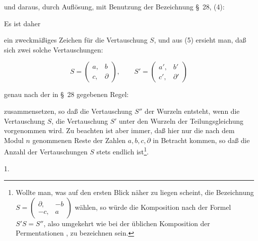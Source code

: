und daraus, durch Auflösung, mit Benutzung der Bezeichnung \S\, 28, (4):


Es ist daher


ein zweckmäßiges Zeichen für die Vertauschung $S$, und aus (5) ersieht man, daß sich zwei solche Vertauschungen:

\[
S = \begin{pmatrix} a, & b \\ c, & \partial \end{pmatrix}, \qquad S' = \begin{pmatrix} a', & b' \\ c', & \partial' \end{pmatrix}
\]

genau nach der in \S\, 28 gegebenen Regel:


zusammensetzen, so daß die Vertauschung $S''$ der Wurzeln entsteht, wenn  die Vertauschung $S$,  die Vertauschung $S'$ unter den Wurzeln der Teilungsgleichung vorgenommen wird. Zu beachten ist aber immer, daß hier nur die nach dem Modul $n$ genommenen Reste der Zahlen $a, b, c, \partial$ in Betracht kommen, so daß die Anzahl der Vertauschungen $S$ stets endlich ist\footnote{Wollte man, was auf den ersten Blick näher zu liegen scheint, die Bezeichnung $S = \begin{pmatrix} \partial, & -b \\ -c, & a \end{pmatrix}$ wählen, so würde die Komposition nach der Formel $S'S = S''$, also umgekehrt wie bei der üblichen Komposition der Permentationen %
, zu bezeichnen sein.}.

1. 

